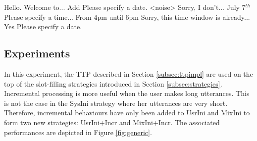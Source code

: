          \begin{dialogue}
            Hello. Welcome to...
            Add
            Please specify a date.
            <noise>
            Sorry, I don't...
            July 7$^{th}$
            Please specify a time...
            From 4pm until 6pm
            Sorry, this time window is already...
            Yes
            Please specify a date.
         \end{dialogue}
    
    \subsection{Experiments}
    
    	In this experiment, the TTP described in Section \ref{subsec:ttpimpl} are used on the top of the slot-filling strategies introduced in Section \ref{subsec:strategies}. Incremental processing is more useful when the user makes long utterances. This is not the case in the SysIni strategy where her utterances are very short. Therefore, incremental behaviours have only been added to UsrIni and MixIni to form two new strategies: UsrIni+Incr and MixIni+Incr. The associated performances are depicted in Figure \ref{fig:generic}.

